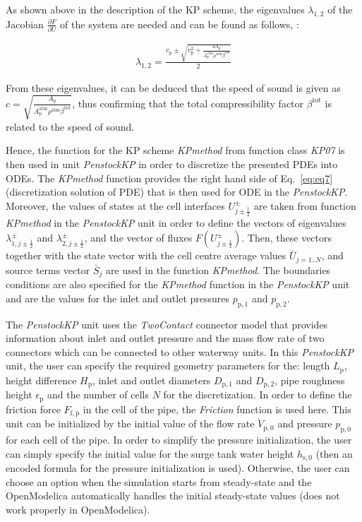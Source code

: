 \documentclass[%
]{USN-PhD}
\begin{document}
As shown above in the description of the KP scheme, the eigenvalues $\lambda_{1,2}$ of the Jacobian $\frac{\partial F}{\partial U}$ of the system are needed and can be found as follows, \cite{Vyt:17}:

\begin{align}
\lambda_{1,2}=\frac{v_\mathrm{p}\pm\sqrt{v_\mathrm{p}^2+\frac{4A_\mathrm{p}}{A_\mathrm{p}^{\text{atm}}\rho^{\text{atm}}\beta^\mathrm{tot}}}}{2}
\end{align}

From these eigenvalues, it can be deduced that the speed of sound is given as $c=\sqrt{\frac{A_\mathrm{p}}{A_\mathrm{p}^{\text{atm}}\rho^{\text{atm}}\beta^\mathrm{tot}}}$, thus confirming that the total compressibility factor $\beta^\mathrm{tot}$ is related to the speed of sound.

Hence, the function for the KP scheme \emph{KPmethod} from function class \emph{KP07} is then used in unit \emph{PenstockKP} in order to discretize the presented PDEs into ODEs. The \emph{KPmethod} function provides the right hand side of Eq.~\ref{eq:eq7} (discretization solution of PDE) that is then used for ODE in the \emph{PenstockKP}. Moreover, the values of states at the cell interfaces $U^\pm_{j\pm\frac{1}{2}}$ are taken from function \emph{KPmethod} in the \emph{PenstockKP} unit in order to define the vectors of eigenvalues $\lambda^\pm_{1,j\pm\frac{1}{2}}$ and $\lambda^\pm_{2,j\pm\frac{1}{2}}$, and the vector of fluxes $F\left(U^\pm_{j\pm\frac{1}{2}}\right)$. Then, these vectors together with the state vector with the cell centre average values $\bar{U}_{j=1..N}$, and source terms vector $\bar{S}_j$ are used in the function \emph{KPmethod}. The boundaries conditions are also specified for the \emph{KPmethod} function in the \emph{PenstockKP} unit and are the values for the inlet and outlet pressures $p_\mathrm{p,1}$ and $p_\mathrm{p,2}$.

The \emph{PenstockKP} unit uses the \emph{TwoContact} connector model that provides information about inlet and outlet pressure and the mass flow rate of two connectors which can be connected to other waterway units. In this \emph{PenstockKP} unit, the user can specify the required geometry parameters for the: length $L_\mathrm{p}$, height difference $H_\mathrm{p}$, inlet and outlet diameters $D_\mathrm{p,1}$ and $D_\mathrm{p,2}$, pipe roughness height $\epsilon_\mathrm{p}$ and the number of cells $N$ for the discretization. In order to define the friction force $F_\mathrm{f,p}$ in the cell of the pipe, the \emph{Friction} function is used here. This unit can be initialized by the initial value of the flow rate $\dot{V}_\mathrm{p,0}$ and pressure $p_\mathrm{p,0}$ for each cell of the pipe. In order to simplify the pressure initialization, the user can simply specify the initial value for the surge tank water height $h_\mathrm{s,0}$ (then an encoded formula for the pressure initialization is used). Otherwise, the user can choose an option when the simulation starts from steady-state and the OpenModelica automatically handles the initial steady-state values (does not work properly in OpenModelica).
\end{document}
